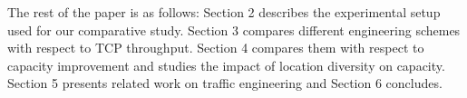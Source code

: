 The rest of the paper is as follows:  Section 2 describes the experimental setup used for our comparative study. Section 3 compares different engineering schemes with respect to TCP throughput. Section 4 compares them with respect to capacity improvement and studies the impact of location diversity on capacity.  Section 5 presents related work on traffic engineering and Section 6 concludes.

